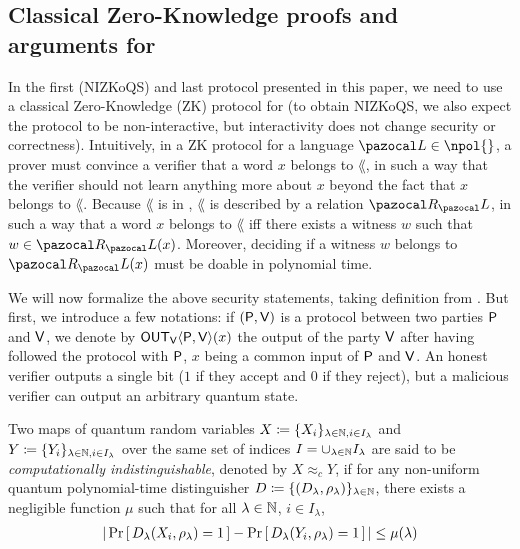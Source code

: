 \subsection{Classical Zero-Knowledge proofs and arguments for \npol{}}\label{subsec:ZK}

In the first (NIZKoQS) and last protocol presented in this paper, we need to use a classical Zero-Knowledge (ZK) protocol for \npol{} (to obtain NIZKoQS, we also expect the protocol to be non-interactive, but interactivity does not change security or correctness). Intuitively, in a ZK protocol for a language $\lang \in \npol{}$, a prover must convince a verifier that a word $x$ belongs to $\lang$, in such a way that the verifier should not learn anything more about $x$ beyond the fact that $x$ belongs to $\lang$. Because $\lang$ is in \npol{}, $\lang$ is described by a relation $\cR_\lang$, in such a way that a word $x$ belongs to $\lang$ iff there exists a witness $w$ such that $w \in \cR_\lang(x)$. Moreover, deciding if a witness $w$ belongs to $\cR_\lang(x)$ must be doable in polynomial time.

We will now formalize the above security statements, taking definition from \cite{BS_2019_ZK_Ct_rounds}. But first, we introduce a few notations: if $(\P{},\V{})$ is a protocol between two parties $\P{}$ and $\V{}$, we denote by $\OUT_\V{}\langle \P{},\V{} \rangle(x)$ the output of the party $\V{}$ after having followed the protocol with $\P{}$, $x$ being a common input of $\P{}$ and $\V{}$. An honest verifier outputs a single bit ($1$ if they accept and $0$ if they reject), but a malicious verifier can output an arbitrary quantum state.

\begin{definition}
  Two maps of quantum random variables $X \eqdef \{X_i\}_{\lambda \in \N, i \in I_\lambda}$ and $Y \eqdef \{Y_i\}_{\lambda \in \N, i \in I_\lambda}$ over the same set of indices $I = \cup_{\lambda\in\N} I_\lambda$ are said to be \emph{computationally indistinguishable}, denoted by $X \approx_c Y$, if for any non-uniform quantum polynomial-time distinguisher $D \eqdef \{(D_\lambda, \rho_\lambda)\}_{\lambda \in \N}$, there exists a negligible function $\mu$ such that for all $\lambda \in \N$, $i \in I_\lambda$,
  \begin{align}
    |\pr{D_\lambda(X_i,\rho_\lambda)=1} - \pr{D_\lambda(Y_i, \rho_\lambda)=1}| \leq \mu(\lambda)
  \end{align}
\end{definition}

